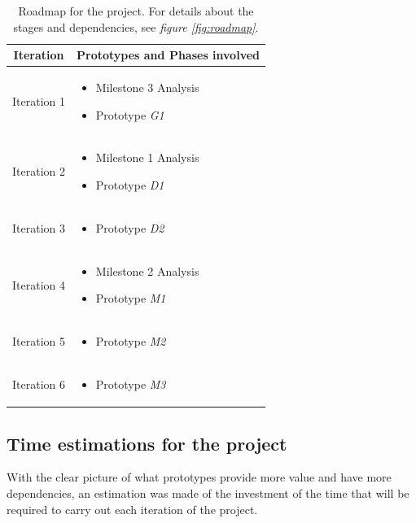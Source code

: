 \begin{table}[H]
	\centering
	\caption{Roadmap for the project. For details about the stages and dependencies, see \emph{figure \ref{fig:roadmap}}.}
	\label{tab:roadmap}
	\begin{tabular}{ | c | p{9cm} |}
		\hline
		\textbf{Iteration} & \textbf{Prototypes and Phases involved} \\ \hline
        Iteration 1  & \begin{itemize} \item Milestone 3 Analysis \item Prototype \emph{G1} \end{itemize} \\ \hline
        Iteration 2  & \begin{itemize} \item Milestone 1 Analysis \item Prototype \emph{D1} \end{itemize} \\ \hline
        Iteration 3  & \begin{itemize} \item Prototype \emph{D2} \end{itemize} \\ \hline
        Iteration 4  & \begin{itemize} \item Milestone 2 Analysis \item Prototype \emph{M1} \end{itemize} \\ \hline
        Iteration 5  & \begin{itemize} \item Prototype \emph{M2} \end{itemize} \\ \hline
        Iteration 6  & \begin{itemize} \item Prototype \emph{M3} \end{itemize} \\ \hline
	\end{tabular}
\end{table}


\subsection{Time estimations for the project}

With the clear picture of what prototypes provide more value and have more dependencies, an estimation was made of the 
investment of the time that will be required to carry out each iteration of the project.


